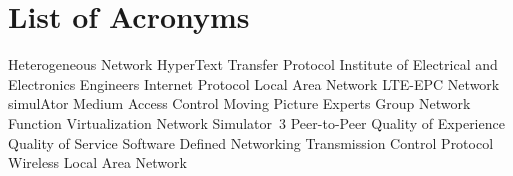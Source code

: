 \section*{List of Acronyms}

\begin{acronym}[CSMA/CA]
	\itemsep0.5pt
     {Heterogeneous Network}
       {HyperText Transfer Protocol}
       {Institute of Electrical and Electronics Engineers}
         {Internet Protocol}
        {Local Area Network}
       {LTE-EPC Network simulAtor}
        {Medium Access Control}
       {Moving Picture Experts Group}
        {Network Function Virtualization}
       {Network Simulator~3}
        {Peer-to-Peer}
        {Quality of Experience}
        {Quality of Service}
        {Software Defined Networking}
        {Transmission Control Protocol}
       {Wireless Local Area Network}
\end{acronym}

